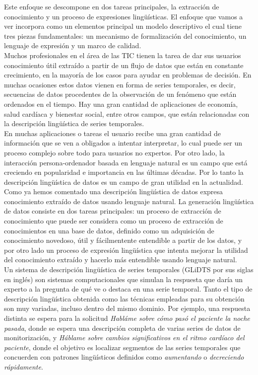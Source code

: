 \documentclass[10pt,a4paper]{article}
\begin{document}
Este enfoque se descompone en dos tareas principales, la extracción de conocimiento y un proceso de expresiones lingüísticas. El enfoque que vamos a ver incorpora como un elementos principal un modelo descriptivo el cual tiene tres piezas fundamentales: un mecanismo de formalización del conocimiento, un lenguaje de expresión y un marco de calidad.\\

Muchos profesionales en el área de las TIC tienen la tarea de dar sus usuarios conocimiento útil extraído a partir de un flujo de datos que están en constante crecimiento, en la mayoría de los casos para ayudar en problemas de decisión. En muchas ocasiones estos datos vienen en forma de series temporales, es decir, secuencias de datos procedentes de la observación de un fenómeno que están ordenados en el tiempo. Hay una gran cantidad de aplicaciones de economía, salud cardíaca y bienestar social, entre otros campos, que están relacionadas con la descripción lingüística de series temporales.\\

En muchas aplicaciones o tareas el usuario recibe una gran cantidad de información que se ven a obligados a intentar interpretar, lo cual puede ser un proceso complejo sobre todo para usuarios no expertos. Por otro lado, la interacción persona-ordenador basada en lenguaje natural es un campo que está creciendo en popularidad e importancia en las últimas décadas. Por lo tanto la descripción lingüística de datos es un campo de gran utilidad en la actualidad.\\

Como ya hemos comentado una descripción lingüística de datos expresa conocimiento extraído de datos usando lenguaje natural. La generación lingüística de datos consiste en dos tareas principales: un proceso de extracción de conocimiento que puede ser considera como un proceso de extracción de conocimientos en una base de datos, definido como un adquisición de conocimiento novedoso, útil y fácilmentente entendible a partir de los datos, y por otro lado un proceso de expresión lingüística que intenta mejorar la utilidad del conocimiento extraído y hacerlo más entendible usando lenguaje natural.\\
 
Un sistema de descripción lingüística de series temporales (GLiDTS por sus siglas en inglés) son sistemas computacionales que simulan la respuesta que daría un experto a la pregunta de qué ve o destaca en una serie temporal. Tanto el tipo de descripción lingüística obtenida como las técnicas empleadas para su obtención son muy variadas, incluso dentro del mismo dominio. Por ejemplo, una respuesta distinta se espera para la solicitud \textit{Habláme sobre cómo pasó el paciente la noche pasada}, donde se espera una descripción completa de varias series de datos de monitorización, y \textit{Háblame sobre cambios significativos en el ritmo cardíaco del paciente}, donde el objetivo es localizar segmentos de las series temporales que concuerden con patrones lingüísticos definidos como \textit{aumentando} o \textit{decreciendo rápidamente}.\\
\end{document}
